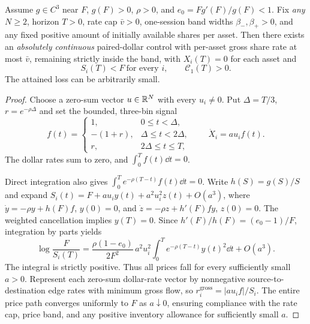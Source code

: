 \documentclass[review,hidelinks,onefignum,onetabnum]{siamonline250211}
\begin{document}
\begin{theorem}\label{thm:finite-rate-construct}
Assume $g\in C^3$ near $F$, $g(F)>0$, $\rho>0$, and $e_0=Fg'(F)/g(F)<1$. Fix \emph{any} $N\ge2$, horizon $T>0$, rate cap $\bar v>0$, one-session band widths $\beta_-,\beta_+>0$, and any fixed positive amount of initially available shares per asset. Then there exists an \emph{absolutely continuous} paired-dollar control with per-asset gross share rate at most $\bar v$, remaining strictly inside the band, with $X_i(T)=0$ for each asset and
\begin{equation}\label{eq:local-speed-crash}
 \ S_i(T)<F\ \text{for every }i,\qquad \mathcal C_1(T)>0.\ 
\end{equation}
The attained loss can be arbitrarily small.
\end{theorem}
\begin{proof}
Choose a zero-sum vector $u\in\mathbb{R}^N$ with every $u_i\ne0$. Put $\Delta=T/3$, $r=e^{-\rho\Delta}$ and set the bounded, three-bin signal
\begin{equation}\label{eq:bounded-control}
 f(t)=
 \begin{cases}
 1,&0\le t<\Delta,\\
 -(1+r),&\Delta\le t<2\Delta,\\
 r,&2\Delta\le t\le T,
 \end{cases}
 \qquad \dot X_i=a u_i f(t).
\end{equation}
The dollar rates sum to zero, and $\int_0^T f(t)\dd t=0$.
\par
Direct integration also gives $\int_0^T e^{-\rho(T-t)}f(t)\dd t=0$.
Write $h(S)=g(S)/S$ and expand
$S_i(t)=F+a u_i y(t)+a^2u_i^2 z(t)+O(a^3)$,
where $\dot y=-\rho y+h(F)f$, $y(0)=0$, and
$\dot z=-\rho z+h'(F)f y$, $z(0)=0$.
The weighted cancellation implies $y(T)=0$. Since $h'(F)/h(F)=(e_0-1)/F$, integration by parts yields
\begin{equation}\label{eq:finite-rate-coefficient}
 \ \log\frac{F}{S_i(T)}=
 \frac{\rho(1-e_0)}{2F^2}\,a^2u_i^2
 \int_0^T e^{-\rho(T-t)}y(t)^2\dd t+O(a^3).\ 
\end{equation}
The integral is strictly positive. Thus all prices fall for every sufficiently small $a>0$. Represent each zero-sum dollar-rate vector by nonnegative source-to-destination edge rates with minimum gross flow, so $r_i^{\mathrm{gross}}=|a u_i f|/S_i$. The entire price path converges uniformly to $F$ as $a\downarrow0$, ensuring compliance with the rate cap, price band, and any positive inventory allowance for sufficiently small $a$.
\end{proof}
\end{document}

